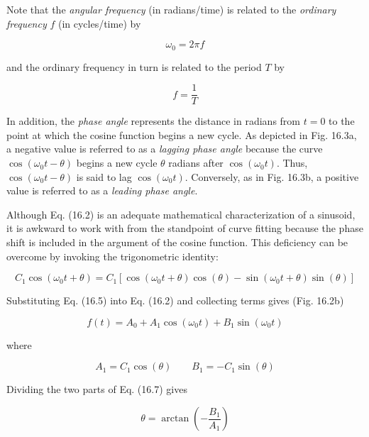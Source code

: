 \documentclass[../main.tex]{subfiles}
\begin{document}
Note that the \textit{angular frequency} (in radians/time) is related to the \textit{ordinary frequency} $f$ (in cycles/time) by 

\begin{equation}
	\tag{16.3}
	\omega_0 = 2 \pi f
\end{equation}

\noindent and the ordinary frequency in turn is related to the period $T$ by

\begin{equation}
	\tag{16.4}
	f = \frac{1}{T}
\end{equation}

In addition, the \textit{phase angle} represents the distance in radians from $t = 0$ to the point at which the cosine function begins a new cycle. As depicted in Fig. 16.3a, a negative value is referred to as a \textit{lagging phase angle} because the curve $\cos(\omega_0 t - \theta)$ begins a new cycle $\theta$ radians after $\cos(\omega_0 t)$. Thus, $\cos(\omega_0 t - \theta)$ is said to lag $\cos(\omega_0 t)$. Conversely, as in Fig. 16.3b, a positive value is referred to as a \textit{leading phase angle}.

Although Eq. (16.2) is an adequate mathematical characterization of a sinusoid, it is awkward to work with from the standpoint of curve fitting because the phase shift is included in the argument of the cosine function. This deficiency can be overcome by invoking the trigonometric identity:

\begin{equation}
	\tag{16.5}
	C_1 \cos(\omega_0 t + \theta) = C_1 [\cos(\omega_0 t + \theta) \cos(\theta) - \sin(\omega_0 t + \theta) \sin(\theta)]
\end{equation}

\noindent Substituting Eq. (16.5) into Eq. (16.2) and collecting terms gives (Fig. 16.2b)

\begin{equation}
	\tag{16.6}
	f(t) = A_0 + A_1 \cos(\omega_0 t) + B_1 \sin(\omega_0 t)
\end{equation}

\noindent where

\begin{equation}
	\tag{16.7}
	A_1 = C_1 \cos(\theta) \quad \quad B_1 = - C_1 \sin(\theta)
\end{equation}

\noindent Dividing the two parts of Eq. (16.7) gives

\begin{equation}
	\tag{16.8}
	\theta = \arctan (- \frac{B_1}{A_1})
\end{equation}
\end{document}
